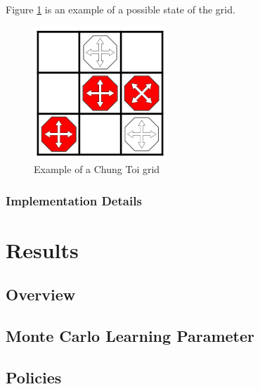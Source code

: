\documentclass[11pt,a4paper]{report}
\begin{document}
Figure \ref{chung-toi-grid-example} is an example of a possible state of the grid.

\begin{figure}[htbp]
	\begin{center}
		\includegraphics[width=50mm]{chung_toi_grid_example.png}
		\caption{Example of a Chung Toi grid\label{chung-toi-grid-example}}
	\end{center}
\end{figure}


\subsection{Implementation Details}



\chapter{Results}


\section{Overview}


\section{Monte Carlo Learning Parameter}


\section{Policies} %
\end{document}
